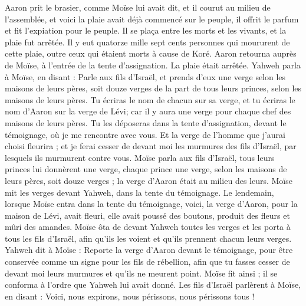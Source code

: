 \begin{multicols}{2}
Aaron prit le brasier, comme Moïse lui avait dit, et il courut au milieu de l'assemblée, et voici la plaie avait déjà commencé sur le peuple, il offrit le parfum et fit l’expiation pour le peuple.
Il se plaça entre les morts et les vivants, et la plaie fut arrêtée.
Il y eut quatorze mille sept cents personnes qui moururent de cette plaie, outre ceux qui étaient morts à cause de Koré.
Aaron retourna auprès de Moïse, à l'entrée de la tente d'assignation. La plaie était arrêtée.
\VerseOne{}Yahweh parla à Moïse, en disant :
Parle aux fils d'Israël, et prends d’eux une verge selon les maisons de leurs pères, soit douze verges de la part de tous leurs princes, selon les maisons de leurs pères. Tu écriras le nom de chacun sur sa verge,
et tu écriras le nom d'Aaron sur la verge de Lévi; car il y aura une verge pour chaque chef des maisons de leurs pères.
Tu les déposeras dans la tente d'assignation, devant le témoignage, où je me rencontre avec vous.
Et la verge de l'homme que j'aurai choisi fleurira ; et je ferai cesser de devant moi les murmures des fils d'Israël, par lesquels ils murmurent contre vous.
Moïse parla aux fils d'Israël, tous leurs princes lui donnèrent une verge, chaque prince une verge, selon les maisons de leurs pères, soit douze verges ; la verge d'Aaron était au milieu des leurs.
Moïse mit les verges devant Yahweh, dans la tente du témoignage.
Le lendemain, lorsque Moïse entra dans la tente du témoignage, voici, la verge d'Aaron, pour la maison de Lévi, avait fleuri, elle avait poussé des boutons, produit des fleurs et mûri des amandes.
Moïse ôta de devant Yahweh toutes les verges et les porta à tous les fils d'Israël, afin qu’ils les voient et qu’ils prennent chacun leurs verges.
Yahweh dit à Moïse : Reporte la verge d'Aaron devant le témoignage, pour être conservée comme un signe pour les fils de rébellion, afin que tu fasses cesser de devant moi leurs murmures et qu’ils ne meurent point.
Moïse fit ainsi ; il se conforma à l’ordre que Yahweh lui avait donné.
Les fils d'Israël parlèrent à Moïse, en disant : Voici, nous expirons, nous périssons, nous périssons tous !

\end{multicols}
